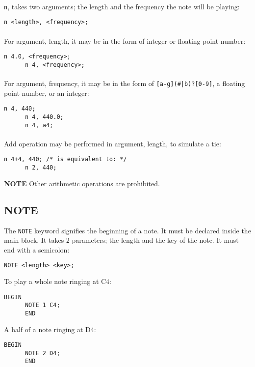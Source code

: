 \documentclass{article}
\begin{document}
\paragraph{} \verb+n+, takes two arguments; the length and the frequency the note will be playing:
\begin{Verbatim}[frame=single]
      n <length>, <frequency>;
\end{Verbatim}

\paragraph{} For argument, length, it may be in the form of integer or floating point number:
\begin{Verbatim}[frame=single]
      n 4.0, <frequency>;
      n 4, <frequency>;
\end{Verbatim}
\paragraph{} For argument, frequency, it may be in the form of \verb+[a-g](#|b)?[0-9]+, a floating
point number, or an integer:
\begin{Verbatim}[frame=single]
      n 4, 440;
      n 4, 440.0;
      n 4, a4;
\end{Verbatim}

\paragraph{} Add operation may be performed in argument, length, to simulate a tie:
\begin{Verbatim}[frame=single]
      n 4+4, 440; /* is equivalent to: */
      n 2, 440; 
\end{Verbatim}
\textbf{NOTE} Other arithmetic operations are prohibited.

\subsection{NOTE}

The \verb+NOTE+ keyword signifies the beginning of a note. It must be declared
inside the main block.
It takes 2 parameters; the length and the key of the note. It must end with
a semicolon: 
\begin{Verbatim}[frame=single]
      NOTE <length> <key>;
\end{Verbatim}

To play a whole note ringing at C4:
\begin{Verbatim}[frame=single]
      BEGIN
      NOTE 1 C4;
      END
\end{Verbatim}
\newpage
A half of a note ringing at D4:
\begin{Verbatim}[frame=single]
      BEGIN
      NOTE 2 D4;
      END
\end{Verbatim}
\end{document}
